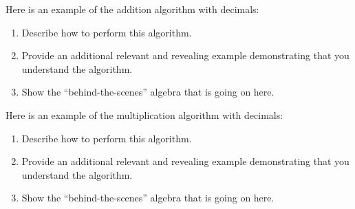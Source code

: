 \documentclass[nooutcomes]{ximera}
\begin{document}
\begin{problem}Here is an example of the addition algorithm with decimals:
\begin{image}
\end{image}

\begin{enumerate}
\item Describe how to perform this algorithm.
\item Provide an additional relevant and revealing example
  demonstrating that you understand the algorithm.
\item Show the ``behind-the-scenes'' algebra that is going on here.
\end{enumerate}
\end{problem} 

\begin{problem}Here is an example of the multiplication algorithm with
  decimals:
\begin{image}
\end{image}
\begin{enumerate}
\item Describe how to perform this algorithm.
\item Provide an additional relevant and revealing example
  demonstrating that you understand the algorithm.
\item Show the ``behind-the-scenes'' algebra that is going on here.
\end{enumerate}
\end{problem} 
\end{document}
